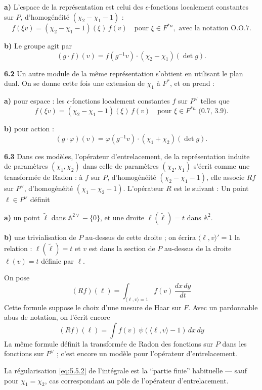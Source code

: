 \documentclass[12pt,a4paper]{article}
\theoremstyle{plain}
\theoremstyle{definition}
\theoremstyle{remark}
\newcommand{\wt}{\widetilde}
\providecommand{\AA}{\mathbb{A}}
\begin{document}
\textbf{a)} L'espace de la représentation est celui des $\epsilon$-fonctions localement constantes sur $P$, d'homogénéité $(\chi_2 - \chi_1 - 1)$ :
\[
f(\xi v) = (\chi_2 - \chi_1 - 1)(\xi) \, f(v) \quad \text{pour } \xi \in F^{*n}, \text{ avec la notation O.O.7}.
\]

\textbf{b)} Le groupe agit par
\[
(g \cdot f)(v) = f(g^{-1} v) \cdot (\chi_2 - \chi_1)(\det g).
\]

\textbf{6.2} Un autre module de la même représentation s'obtient en utilisant le plan dual. On se donne cette fois une extension de $\chi_1$ à $F^*$, et on prend :

\textbf{a)} pour espace : les $\epsilon$-fonctions localement constantes $f$ sur $P^\vee$ telles que
\[
f(\xi v) = (\chi_2 - \chi_1 - 1)(\xi) \, f(v) \quad \text{pour } \xi \in F^{*n} \text{ (0.7, 3.9)}.
\]

\textbf{b)} pour action :
\[
(g \cdot \varphi)(v) = \varphi(g^{-1} v) \cdot (\chi_1 + \chi_2)(\det g).
\]

\textbf{6.3} Dans ces modèles, l'opérateur d'entrelacement, de la représentation induite de paramètres $(\chi_1, \chi_2)$ dans celle de paramètres $(\chi_2, \chi_1)$ s'écrit comme une transformée de Radon : à $f$ sur $P$, d'homogénéité $(\chi_2 - \chi_1 - 1)$, elle associe $Rf$ sur $P^\vee$, d'homogénéité $(\chi_1 - \chi_2 - 1)$. L'opérateur $R$ est le suivant : Un point $\ell \in P^\vee$ définit

\textbf{a)} un point $\wt{\ell}$ dans $\AA^{2\vee} - \{0\}$, et une droite $\ell(\wt{\ell}) = t$ dans $\AA^2$.

\textbf{b)} une trivialisation de $P$ au-dessus de cette droite ; on écrira $\langle \ell, v \rangle' = 1$ la relation : $\ell(\wt{\ell}) = t$ et $v$ est dans la section de $P$ au-dessus de la droite $\ell(v) = t$ définie par $\ell$.

On pose
\[
(Rf)(\ell) = \int_{\langle \ell, v \rangle = 1} f(v) \, \frac{dx \, dy}{dt}
\]
Cette formule suppose le choix d'une mesure de Haar sur $F$. Avec un pardonnable abus de notation, on l'écrit encore
\[
(Rf)(\ell) = \int f(v) \, \psi(\langle \ell, v \rangle - 1) \, dx \, dy
\]
La même formule définit la transformée de Radon des fonctions sur $P$ dans les fonctions sur $P^\vee$ ; c'est encore un modèle pour l'opérateur d'entrelacement.

La régularisation \eqref{eq:5.5.2} de l'intégrale est la ``partie finie'' habituelle --- sauf pour $\chi_1 = \chi_2$, cas correspondant au pôle de l'opérateur d'entrelacement.
\end{document}
